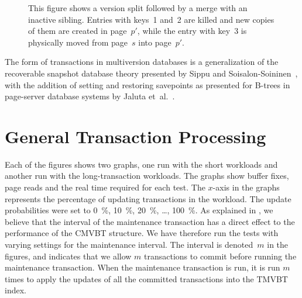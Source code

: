 \begin{figure}[!htb]
\begin{center}
  
  {This figure shows a version split followed by a merge with an inactive
  sibling. 
  Entries with keys~\num{1} and~{2} are killed and new copies of them are
  created in page~$p'$, while the entry with key~\num{3} is physically moved
  from page~$s$ into page~$p'$.}
  \label{fig:split-imi1-example}
\end{center}
\end{figure}

The form of transactions in multiversion databases is a generalization of 
the recoverable snapshot database theory presented by Sippu and
Soisalon-Soininen~\cite{sippu:2001:theory}, with the
addition of setting and restoring savepoints as presented for B-trees in
page-server database systems by Jaluta et~al.~\cite{jaluta:2006:page-server}.
\label{def:cmvbt}\label{def:immortaldb}
\label{def:mvas}
\label{def:mvbt}
\label{def:si}
\label{def:deletemark}
\label{def:smo}
\label{def:tmvbt}
\label{def:vtt}
\label{def:vbt}
\label{def:wal}
\label{def:lru}
\label{def:cti}
\label{def:lsn}
\label{def:dag}
\label{def:ptt}
\label{def:tsb}
\label{def:worm}
\label{def:wmrm}
\label{def:mbr}

\section{General Transaction Processing}
\label{sec:performance:general}
Each of the figures shows two graphs, one run with the short
workloads and another run with the long-transaction workloads.
The graphs show buffer fixes, page reads and the real time required for each
test. 
The \mbox{$x$-axis} in the graphs represents the percentage of updating
transactions in the workload. 
The update probabilities were set to \SI{0}{\percent}, \SI{10}{\percent},
\SI{20}{\percent}, \ldots, \SI{100}{\percent}. 
As explained in , we believe that
the interval of the maintenance transaction has a direct effect to the
performance of the CMVBT structure.
We have therefore run the tests with varying settings for the
maintenance interval. 
The interval is denoted~$m$ in the figures, and indicates that we allow $m$
transactions to commit before running the maintenance transaction.
When the maintenance transaction is run, it is run $m$ times to apply
the updates of all the committed transactions into the TMVBT index.


